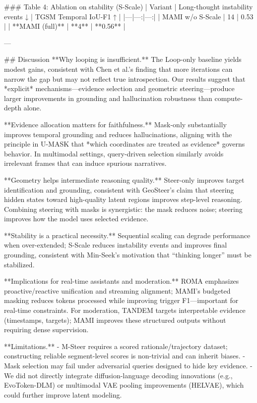 ### Table 4: Ablation on stability (S-Scale)  
| Variant | Long-thought instability events ↓ | TGSM Temporal IoU-F1 ↑ |
|---|---:|---:|
| MAMI w/o S-Scale | 14 | 0.53 |
| **MAMI (full)** | **4** | **0.56** |

---

## Discussion  
**Why looping is insufficient.** The Loop-only baseline yields modest gains, consistent with Chen et al.’s finding that more iterations can narrow the gap but may not reflect true introspection. Our results suggest that *explicit* mechanisms—evidence selection and geometric steering—produce larger improvements in grounding and hallucination robustness than compute-depth alone.

**Evidence allocation matters for faithfulness.** Mask-only substantially improves temporal grounding and reduces hallucinations, aligning with the principle in U-MASK that *which coordinates are treated as evidence* governs behavior. In multimodal settings, query-driven selection similarly avoids irrelevant frames that can induce spurious narratives.

**Geometry helps intermediate reasoning quality.** Steer-only improves target identification and grounding, consistent with GeoSteer’s claim that steering hidden states toward high-quality latent regions improves step-level reasoning. Combining steering with masks is synergistic: the mask reduces noise; steering improves how the model uses selected evidence.

**Stability is a practical necessity.** Sequential scaling can degrade performance when over-extended; S-Scale reduces instability events and improves final grounding, consistent with Min-Seek’s motivation that “thinking longer” must be stabilized.

**Implications for real-time assistants and moderation.** ROMA emphasizes proactive/reactive unification and streaming alignment; MAMI’s budgeted masking reduces tokens processed while improving trigger F1—important for real-time constraints. For moderation, TANDEM targets interpretable evidence (timestamps, targets); MAMI improves these structured outputs without requiring dense supervision.

**Limitations.**  
- M-Steer requires a scored rationale/trajectory dataset; constructing reliable segment-level scores is non-trivial and can inherit biases.  
- Mask selection may fail under adversarial queries designed to hide key evidence.  
- We did not directly integrate diffusion-language decoding innovations (e.g., EvoToken-DLM) or multimodal VAE pooling improvements (HELVAE), which could further improve latent modeling.

